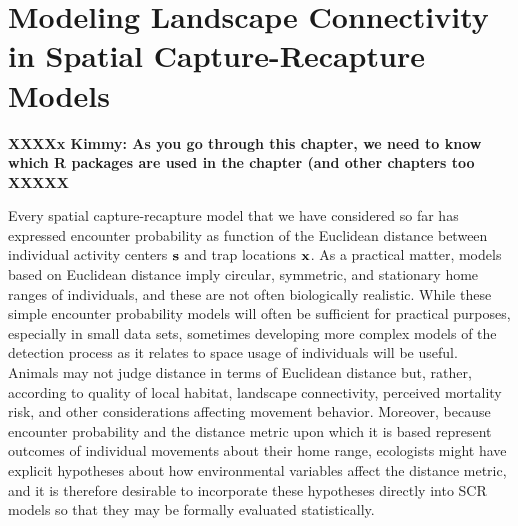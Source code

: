 \chapter{
Modeling Landscape Connectivity in Spatial Capture-Recapture Models
}
\label{chapt.ecoldist}


\vspace{.3in}

{\bf XXXXx Kimmy: As you go through this chapter, we need to know
  which R packages are used in the chapter (and other chapters too XXXXX}


Every spatial capture-recapture model that we have considered so far
has expressed encounter probability as function of the Euclidean
distance between individual activity
centers ${\bf s}$ and trap locations ${\bf x}$. 
As a practical matter, models based on Euclidean
distance imply circular, symmetric, and stationary home ranges of
individuals, and these are not often biologically realistic.
While these simple encounter
probability models will often
be sufficient for practical
purposes, especially in small data sets, sometimes developing more
complex models of the detection process as it relates to space usage
of individuals will be useful.  Animals may not judge distance in
terms of Euclidean distance but, rather, according to quality of local
habitat, landscape connectivity, perceived mortality risk, and other
considerations affecting movement behavior.
Moreover, because encounter probability and the distance
metric upon which it is based represent outcomes of individual
movements about their home range, ecologists might have explicit
hypotheses about how environmental variables affect the distance
metric, and it is therefore desirable to incorporate these hypotheses
directly into SCR models so that they may be formally evaluated
statistically.  


